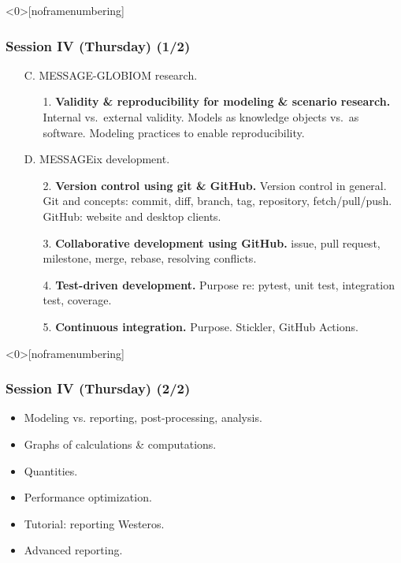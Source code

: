 \documentclass[12pt,aspectratio=169]{beamer}
\begin{document}
\begin{frame}<0>[noframenumbering] %
\frametitle{
  Session IV (Thursday) (1/2)  %
}

\begin{enumerate}
  \item [C.] MESSAGE-GLOBIOM research.
    \begin{enumerate}
      \item [1.] \textbf{Validity \& reproducibility for modeling \& scenario research.} Internal vs.\ external validity. Models as knowledge objects vs.\ as software. Modeling practices to enable reproducibility.
    \end{enumerate}

  \item [D.] MESSAGEix development.
    \begin{enumerate}
      \item [2.] \textbf{Version control using git \& GitHub.} Version control in general. Git and concepts: commit, diff, branch, tag, repository, fetch/pull/push. GitHub: website and desktop clients.
      \item [3.] \textbf{Collaborative development using GitHub.} issue, pull request, milestone, merge, rebase, resolving conflicts.
      \item [4.] \textbf{Test-driven development.} Purpose re: pytest, unit test, integration test, coverage.
      \item [5.] \textbf{Continuous integration.} Purpose. Stickler, GitHub Actions.
    \end{enumerate}

\end{enumerate}

\end{frame}

\begin{frame}<0>[noframenumbering] %
\frametitle{
  Session IV (Thursday) (2/2) %
}


\begin{itemize}
  \item Modeling vs. reporting, post-processing, analysis.
  \item Graphs of calculations \& computations.
  \item Quantities.
  \item Performance optimization.
  \item Tutorial: reporting Westeros.
  \item Advanced reporting.
\end{itemize}

\end{frame}
\end{document}
